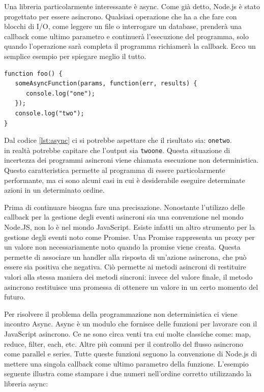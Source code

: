 Una libreria particolarmente interessante è async. 
Come già detto, Node.js è stato progettato per essere asincrono.
Qualsiasi operazione che ha a che fare con blocchi di I/O, come leggere un file o interrogare un database, prenderà una callback come ultimo parametro e continuerà l'esecuzione del programma, 
solo quando l'operazione sarà completa il programma richiamerà la callback. 
Ecco un semplice esempio per spiegare meglio il tutto.

\begin{lstlisting}[caption={operazioni asincrone}, style=javaScriptCode, label={lst:async}]
function foo() {
   someAsyncFunction(params, function(err, results) {
      console.log("one");
   });
   console.log("two");
}
\end{lstlisting}

Dal codice \ref{lst:async} ci si potrebbe aspettare che il risultato sia:
\texttt{onetwo}.\\
in realtà potrebbe capitare che l’output sia \texttt{twoone}.
Questa situazione di incertezza dei programmi asincroni viene chiamata esecuzione non deterministica. 
Questo caratteristica permette al programma di essere particolarmente performante, ma ci sono alcuni casi in cui è desiderabile eseguire determinate azioni in un determinato ordine. 

Prima di continuare bisogna fare una precisazione. 
Nonostante l'utilizzo delle callback per la gestione degli eventi asincroni sia una convenzione nel mondo Node.JS, non lo è nel mondo JavaScript.
Esiste infatti un altro strumento per la gestione degli eventi noto come Promise.
Una Promise rappresenta un proxy per un valore non necessariamente noto quando la promise viene creata.
Questa permette di associare un handler alla risposta di un'azione asincrona, che può essere sia positiva che negativa. 
Ciò permette ai metodi asincroni di restituire valori alla stessa maniera dei metodi sincroni: invece del valore finale, il metodo asincrono restituisce una promessa di ottenere un valore in un certo momento del futuro.

Per risolvere il problema della programmazione non deterministica ci viene incontro Async.
Async è un modulo che fornisce delle funzioni per lavorare con il JavaScript asincrono.
Ce ne sono circa venti tra cui molte classiche come: map, reduce, filter, each, etc. 
Altre più comuni per il controllo del flusso asincrono come parallel e series.
Tutte queste funzioni seguono la convenzione di Node.js di mettere una singola callback come ultimo parametro della funzione. 
L'esempio seguente illustra come stampare i due numeri nell'ordine corretto utilizzando la libreria async:

